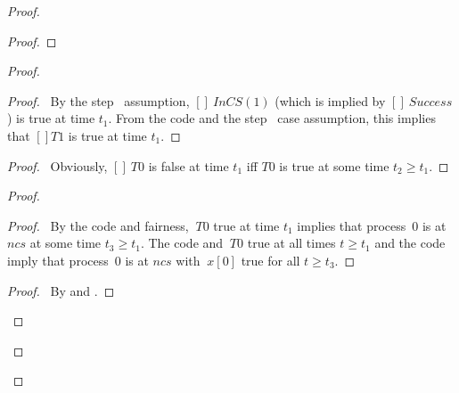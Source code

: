 \documentclass[fleqn,leqno]{article}
\begin{document}
\begin{proof}
\begin{proof}
\end{proof}


\begin{proof}
  \begin{proof}
     \pf\ By the step~ assumption, $[]~InCS(1)$ 
     (which is implied by $[]~Success$) is true
     at time $t_{1}$.  From the code and the
     step~ case assumption, this implies that
     $[]T1$ is true at time $t_{1}$.
  \end{proof}

   \begin{proof}
   \pf\ Obviously, $[]~T0$ is false at time $t_{1}$ iff $T0$ is true
    at some time $t_{2}\geq t_{1}$.
   \end{proof}

\begin{proof}
     \begin{proof}
     \pf\ By the code and fairness, $~T0$ true at time $t_{1}$ implies
     that process~0 is at $ncs$ at some time $t_{3}\geq t_{1}$. 
     The code and $~T0$ true at all times $t\geq t_{1}$ and the code 
     imply that process~0 is at $ncs$ with $~x[0]$ true for all 
     $t\geq t_{3}$.
     \end{proof}
     \begin{proof}
     \pf\ By  and .
     \end{proof}


\end{proof}
\end{proof}
\end{proof}
\end{document}
